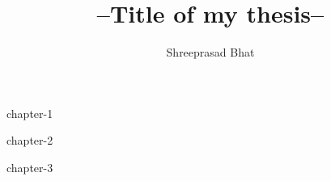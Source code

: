 \documentclass[a4paper,twoside]{iiththesis}
\title{--Title of my thesis--}
\author{Shreeprasad Bhat}
\begin{document}
{chapter-1}

{chapter-2}

{chapter-3}



\clearpage
\newpage
{} %
\end{document}
